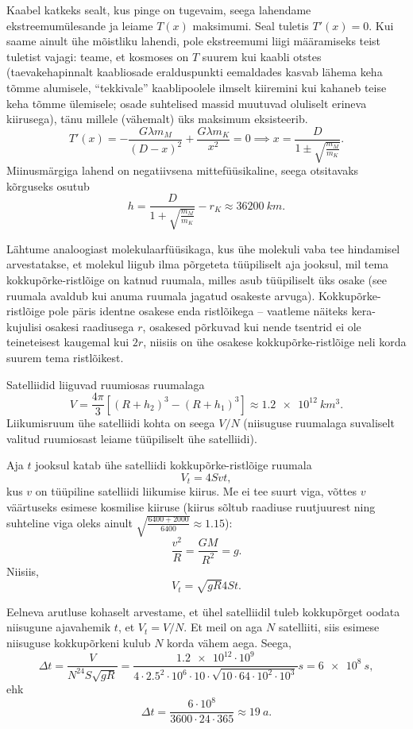 \documentclass[10pt]{article}
\begin{document}
{Kaabel katkeks sealt, kus pinge on tugevaim, seega lahendame
ekst\-ree\-mum\-üles\-an\-de
ja leiame $T(x)$ maksimumi. Seal tuletis $T'(x)=0$. Kui saame ainult ühe mõistliku lahendi, pole
ekstreemumi liigi määramiseks teist tuletist vajagi: teame, et kosmoses on $T$
suurem kui kaabli otstes (taevakehapinnalt kaabliosade eralduspunkti
eemaldades kasvab lähema keha tõmme alumisele, \enquote{tekkivale} kaablipoolele ilmselt kiiremini
kui kahaneb teise keha tõmme ülemisele; osade suhtelised massid muutuvad
oluliselt erineva kiirusega), tänu millele (vähemalt) üks maksimum eksisteerib.
\[ 
T'(x) = - \frac{ G\lambda m_M }{ (D-x)^2 } + \frac{ G\lambda m_K }{ x^2 } = 0
\implies x = \frac{D}{1 \pm \sqrt{\frac{m_M}{m_K}}}.
\]
Miinusmärgiga lahend on negatiivsena mittefüüsikaline, seega otsitavaks
kõr\-gu\-seks osutub
\[ 
h = \frac{D}{1 + \sqrt{\frac{m_M}{m_K}}} - r_K \approx
\SI{36200}{km}.
\]
\probend
\bigskip


\solu
Lähtume analoogiast molekulaarfüüsikaga, kus ühe molekuli vaba tee hindamisel arvestatakse, et molekul liigub ilma põrgeteta tüüpiliselt aja jooksul, mil tema kokkupõrke-ristlõige on katnud ruumala, milles asub tüüpiliselt üks osake (see ruumala avaldub kui anuma ruumala jagatud osakeste arvuga). Kokkupõrke-ristlõige pole päris identne osakese enda ristlõikega -- vaatleme näiteks kera-kujulisi osakesi raadiusega $r$, osakesed põrkuvad kui nende tsentrid ei ole teineteisest kaugemal kui $2r$, niisiis on ühe osakese kokkupõrke-ristlõige neli korda suurem tema ristlõikest.

Satelliidid liiguvad ruumiosas ruumalaga
\[ V=\frac{4\pi}{3}\left[(R+h_2)^3-(R+h_1)^3\right]\approx \SI{1.2e12}{km^3}.\]
Liikumisruum ühe satelliidi kohta on seega $V/N$ (niisuguse ruumalaga suvaliselt valitud ruumiosast leiame tüüpiliselt ühe satelliidi).

Aja $t$ jooksul katab ühe satelliidi kokkupõrke-ristlõige ruumala
\[V_t=4Svt,\]
kus $v$ on tüüpiline satelliidi liikumise kiirus. Me ei tee suurt viga, võttes $v$ väärtuseks esimese kosmilise kiiruse (kiirus sõltub raadiuse ruutjuurest ning suhteline viga oleks ainult \mbox{$\sqrt{\frac{6400+2000}{6400}}\approx\num{1.15}$}):
\[\frac{v^2}{R}=\frac{GM}{R^2}=g.\]
Niisiis,
\[V_t=\sqrt{gR}4St.\]

Eelneva arutluse kohaselt arvestame, et ühel satelliidil tuleb kokkupõrget oodata niisugune ajavahemik $t$, et $V_t=V/N$. Et meil on aga $N$ satelliiti, siis esimese niisuguse kokkupõrkeni kulub $N$ korda vähem aega. Seega,
\[
\Delta t=\frac{V}{N^24S\sqrt{gR}}=\frac{\num{1.2e12}\cdot 10^9}{\num{4}\cdot\num{2.5}^2\cdot 10^6\cdot \num{10}\cdot \sqrt{10 \cdot \num{64} \cdot 10^2\cdot 10^3}}s=\SI{6e8}{s},
\]
ehk
\[
\Delta t=\frac{6\cdot10^{8}}{3600\cdot24\cdot365}\approx \SI{19}{a}.
\]
\probend
\bigskip

}
\end{document}
